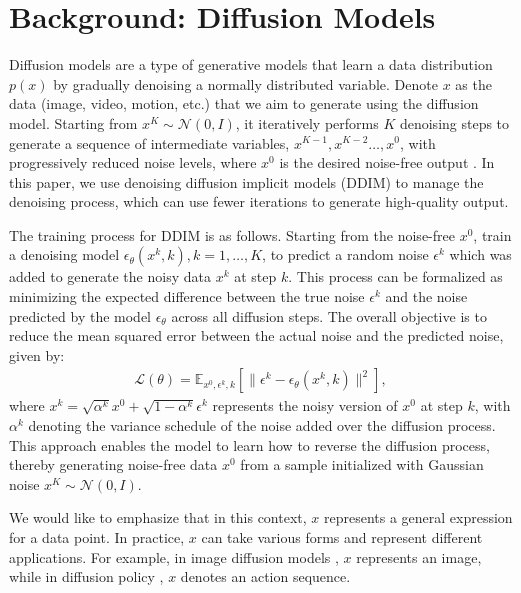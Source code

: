 \documentclass[doublecolumn]{IEEEtran}
\begin{document}
\section{Background: Diffusion Models}




{Diffusion models \cite{sohl2015deep} are a type of generative models that learn a data distribution $p(x)$ by gradually denoising a normally distributed variable. Denote $x$ as the data (image, video, motion, etc.) that we aim to generate using the diffusion model. Starting from $x^K \sim \mathcal{N}(0, I)$, it iteratively performs $K$ denoising steps to generate a sequence of intermediate variables, $ x^{K-1},x^{K-2} \ldots, x^0$, with progressively reduced noise levels, where $x^0$ is the desired noise-free output \cite{ho2020denoising}. In this paper, we use denoising diffusion implicit models (DDIM) \cite{song2020denoising} to manage the denoising process, which can use fewer iterations to generate high-quality output.}

{The training process for DDIM is as follows. Starting from the noise-free $x^0$, train a denoising model {$\epsilon_\theta(x^k, k), k = 1, \ldots, K$,} to predict a random noise $\epsilon^k$ which was added to generate the noisy data $x^k$ at step $k$. This process can be formalized as minimizing the expected difference between the true noise $\epsilon^k$ and the noise predicted by the model $\epsilon_\theta$ across all diffusion steps. The overall objective is to reduce the mean squared error between the actual noise and the predicted noise, given by:
\begin{align}
    \mathcal{L}(\theta) = \mathbb{E}_{x^0, \epsilon^k, k}\left[ \| \epsilon^k - \epsilon_\theta(x^k, k) \|^2 \right],\label{eq:dm_loss}
\end{align}
where $x^k = \sqrt{{\alpha}^k} x^0 + \sqrt{1-{\alpha}^k} \epsilon^k$ represents the noisy version of $x^0$ at step $k$, with ${\alpha}^k$ denoting the variance schedule of the noise added over the diffusion process. This approach enables the model to learn how to reverse the diffusion process, thereby generating noise-free data $x^0$ from a sample initialized with Gaussian noise $x^K \sim \mathcal{N}(0, I)$.}

{We would like to emphasize that in this context, $x$ represents a general expression for a data point. In practice, $x$ can take various forms and represent different applications. For example, in image diffusion models \cite{ho2020denoising}, $x$ represents an image, while in diffusion policy \cite{chi2023diffusionpolicy}, $x$ denotes an action sequence.}
\end{document}
